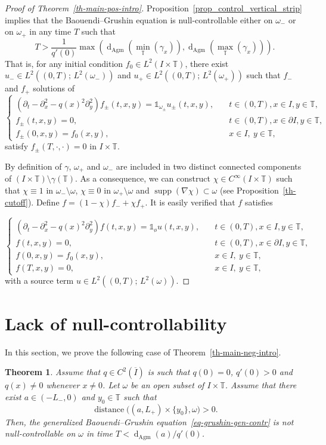 \documentclass[10pt]{amsart}
\newtheorem{theo}{Theorem}[section]
\theoremstyle{definition}\newtheorem{defi}[theo]{Definition}\newtheorem{rema}[theo]{Remark}\newtheorem{exam}[theo]{Example}\newtheorem{exem}[theo]{Example}\newtheorem{nota}[theo]{Notation}
\newcommand{\1}{\mathds 1}
\DeclareMathOperator{\distance}{distance}
\DeclareMathOperator{\supp}{supp}
\newcommand{\dagmon}{\mathop{\mathrm{d}}\nolimits_{\mathrm{Agm}}}
\newcommand{\T}{\mathbb{T}}
\renewcommand{\o}{\omega}
\begin{document}
\begin{proof}[Proof of Theorem~\ref{th-main-pos-intro}]
Proposition~\ref{prop_control_vertical_strip} implies that the Baouendi--Grushin equation is null-controllable either on $\o_-$ or on $\o_+$ in any time $T$ such that
\[
T> \frac 1 {q'(0)} \max\left(\dagmon\left(\min_\T(\gamma_x)\right), \dagmon\left(\max_\T (\gamma_x)\right) \right).
\]
That is, for any initial condition $f_0 \in L^2(I\times \T)$, there exist $u_-\in L^2((0,T);\, L^2(\o_-))$ and $u_+\in L^2((0,T);\, L^2(\o_+))$ such that $f_-$ and $f_+$ solutions of
\[
\left\{
\begin{array}{ll}
\left(\partial_t-\partial_x^2 - q(x)^2 \partial_y^2\right)f_\pm(t,x,y) = \mathds 1_{\o_\pm} u_\pm(t,x,y),&\quad t\in (0,T), x\in I, y\in \T,\\
f_\pm(t,x,y) = 0,&\quad t\in (0,T), x\in\partial I, y\in \T, \\
f_\pm(0,x,y) = f_0(x,y), & \quad x \in I, \ y \in \T,
\end{array}\right.
\]
satisfy $f_\pm(T,\cdot,\cdot) = 0$ in $I\times \T$.

By definition of $\gamma$, $\omega_+$ and $\omega_-$ are included in two distinct connected components of $(I \times \T) \setminus \gamma(\T)$. As a consequence, we can construct $\chi \in C^\infty(I\times \T)$ such that $\chi \equiv 1$ in $\omega_-\setminus \omega$, $\chi \equiv 0$ in $\omega_+\setminus \omega$ and $\supp(\nabla \chi) \subset \o$ (see Proposition~\ref{th-cutoff}). Define $ f = (1-\chi) f_- + \chi f_+$. It is easily verified that $f$ satisfies

\[
\left\{
\begin{array}{ll}
\left(\partial_t-\partial_x^2 - q(x)^2 \partial_y^2\right)f(t,x,y) = \mathds 1_{\text{ø}} u(t,x,y), &\quad t\in (0,T), x\in I, y\in \T,\\
f(t,x,y) = 0,&\quad t\in (0,T), x\in\partial I, y\in \T, \\
f(0,x,y) = f_0(x,y), & \quad x \in I, \ y \in \T, \\
f(T,x,y) = 0, & \quad x \in I, \ y \in \T,
\end{array}\right.
\]
with a source term $u \in L^2((0,T);\, L^2(\o))$.
\end{proof}

\section{Lack of null-controllability}\label{sec_negative_result}
In this section, we prove the following case of Theorem~\ref{th-main-neg-intro}.

\begin{theo}\label{th-main-neg}
Assume that $q\in C^2(\overline I)$ is such that $q(0) = 0$, $q'(0) > 0$ and $q(x) \neq 0$ whenever $x\neq 0$. Let $\o$ be an open subset of $I\times \T$. Assume that there exist $a \in (-L_-,0)$ and $y_0 \in \T$ such that
\[
\distance\big((a,L_+)\times \{y_0\}, \o\big) > 0.
\]
Then, the generalized Baouendi--Grushin equation~\eqref{eq-grushin-gen-contr} is not null-controllable on $\o$ in time $T< \dagmon(a)/q'(0)$.
\end{theo}
\end{document}
